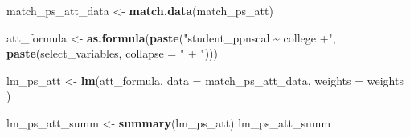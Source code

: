 \documentclass[
]{article}
\newenvironment{Shaded}{\begin{snugshade}}{\end{snugshade}}
\newcommand{\AttributeTok}[1]{\textcolor[rgb]{0.13,0.29,0.53}{#1}}
\newcommand{\FunctionTok}[1]{\textcolor[rgb]{0.13,0.29,0.53}{\textbf{#1}}}
\newcommand{\NormalTok}[1]{#1}
\newcommand{\OtherTok}[1]{\textcolor[rgb]{0.56,0.35,0.01}{#1}}
\newcommand{\StringTok}[1]{\textcolor[rgb]{0.31,0.60,0.02}{#1}}
\begin{document}
\begin{Shaded}
\begin{Highlighting}[]
\NormalTok{match\_ps\_att\_data }\OtherTok{\textless{}{-}} \FunctionTok{match.data}\NormalTok{(match\_ps\_att)   }

\NormalTok{att\_formula }\OtherTok{\textless{}{-}} \FunctionTok{as.formula}\NormalTok{(}\FunctionTok{paste}\NormalTok{(}\StringTok{"student\_ppnscal \textasciitilde{} college +"}\NormalTok{, }\FunctionTok{paste}\NormalTok{(select\_variables, }\AttributeTok{collapse =} \StringTok{" + "}\NormalTok{)))}

\NormalTok{lm\_ps\_att }\OtherTok{\textless{}{-}} \FunctionTok{lm}\NormalTok{(att\_formula, }\AttributeTok{data =}\NormalTok{ match\_ps\_att\_data, }\AttributeTok{weights =}\NormalTok{ weights )}

\NormalTok{lm\_ps\_att\_summ }\OtherTok{\textless{}{-}} \FunctionTok{summary}\NormalTok{(lm\_ps\_att)}
\NormalTok{lm\_ps\_att\_summ}
\end{Highlighting}
\end{Shaded}
\end{document}

